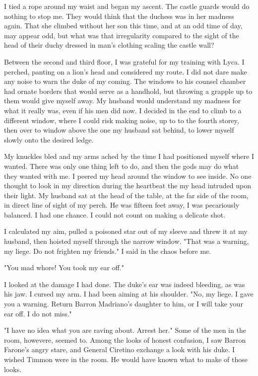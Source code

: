 \documentclass{article}
\begin{document}
I tied a rope around my waist and began my ascent. The castle guards would do nothing to stop me. They would think that the duchess was in her madness again. That she climbed without her son this time, and at an odd time of day, may appear odd, but what was that irregularity compared to the sight of the head of their duchy dressed in man's clothing scaling the castle wall?

Between the second and third floor, I was grateful for my training with Lyca. I perched, panting on a lion's head and considered my route. I did not dare make any noise to warn the duke of my coming. The windows to his counsel chamber had ornate borders that would serve as a handhold, but throwing a grapple up to them would give myself away. My husband would understand my madness for what it really was, even if his men did now. I decided in the end to climb to a different window, where I could risk making noise, up to to the fourth storey, then over to window above the one my husband sat behind, to lower myself slowly onto the desired ledge. 

My knuckles bled and my arms ached by the time I had positioned myself where I wanted. There was only one thing left to do, and then the gods may do what they wanted with me. I peered my head around the window to see inside. No one thought to look in my direction during the heartbeat the my head intruded upon their light. My husband sat at the head of the table, at the far side of the room, in direct line of sight of my perch. He was fifteen feet away, I was pecariously balanced. I had one chance. I could not count on making a delicate shot. 

I calculated my aim, pulled a poisoned star out of my sleeve and threw it at my husband, then hoisted myself through the narrow window. "That was a warning, my liege. Do not frighten my friends." I said in the chaos before me.

"You mad whore! You took my ear off."

I looked at the damage I had done. The duke's ear was indeed bleeding, as was his jaw. I cursed my arm. I had been aiming at his shoulder. "No, my liege. I gave you a warning. Return Barron Madriano's daughter to him, or I will take your ear off. I do not miss."

"I have no idea what you are raving about. Arrest her." Some of the men in the room, howevere, seemed to. Among the looks of honest confusion, I saw Barron Farone's angry stare, and General Ciretino exchange a look with his duke. I wished Timmon were in the room. He would have known what to make of those looks.
\end{document}

